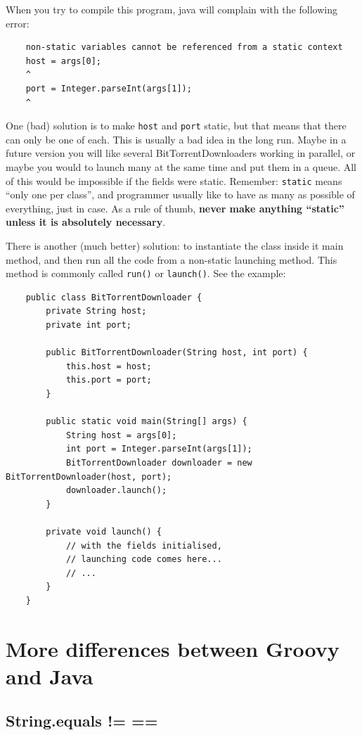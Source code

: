 When you try to compile this program, java will complain with the
following error: 

\begin{verbatim}
    non-static variables cannot be referenced from a static context
    host = args[0];
    ^
    port = Integer.parseInt(args[1]);
    ^
\end{verbatim}

One (bad) solution is to make \verb+host+ and \verb+port+ static, but
that means that there can only be one of each. This is usually a bad
idea in the long run. Maybe in a future version you will like several
BitTorrentDownloaders working in parallel, or maybe you would to
launch many at the same time and put them in a queue. All of this
would be impossible if the fields were static. Remember: \verb+static+
means ``only one per class'', and programmer usually like to have as
many as possible of everything, just in case. As a rule of thumb,
\textbf{never make anything ``static'' unless it is absolutely necessary}.

There is another (much better) solution: to instantiate the class
inside it main method, and then run all the code from a non-static
launching method. This method is commonly called \verb+run()+ or
\verb+launch()+. See the example: 

\begin{verbatim}
    public class BitTorrentDownloader {
        private String host;
        private int port;
    
        public BitTorrentDownloader(String host, int port) {
            this.host = host;
            this.port = port;
        }
    
        public static void main(String[] args) {
            String host = args[0];
            int port = Integer.parseInt(args[1]);
            BitTorrentDownloader downloader = new BitTorrentDownloader(host, port);
            downloader.launch();
        }

        private void launch() {
            // with the fields initialised, 
            // launching code comes here...
            // ...
        }
    }
\end{verbatim}

\section{More differences between Groovy and Java}
\label{sec:more-diff-betw}

\subsection{String.equals != ==}
\label{sec:string.equals-=-==}

